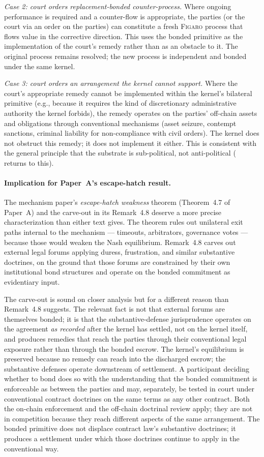 \documentclass[11pt,a4paper]{article}
\theoremstyle{remark}
\newcommand{\figaro}{\textsc{Figaro}}
\begin{document}
\emph{Case 2: court orders replacement-bonded counter-process.}
Where ongoing performance is required and a counter-flow is
appropriate, the parties (or the court via an order on the
parties) can constitute a fresh \figaro{} process that flows
value in the corrective direction. This uses the bonded
primitive as the implementation of the court's remedy rather
than as an obstacle to it. The original process remains
resolved; the new process is independent and bonded under the
same kernel.

\emph{Case 3: court orders an arrangement the kernel cannot
support.}
Where the court's appropriate remedy cannot be implemented
within the kernel's bilateral primitive (e.g., because it
requires the kind of discretionary administrative authority the
kernel forbids), the remedy operates on the parties' off-chain
assets and obligations through conventional mechanisms (asset
seizure, contempt sanctions, criminal liability for non-compliance
with civil orders). The kernel does not obstruct this remedy;
it does not implement it either. This is consistent with the
general principle that the substrate is sub-political, not
anti-political ( returns to this).

\paragraph{Implication for Paper~A's escape-hatch result.}
The mechanism paper's \emph{escape-hatch weakness} theorem
(Theorem~4.7 of Paper~A) and the carve-out in its Remark~4.8
deserve a more precise characterization than either text gives.
The theorem rules out unilateral exit paths internal to the
mechanism --- timeouts, arbitrators, governance votes ---
because those would weaken the Nash equilibrium. Remark~4.8
carves out external legal forums applying duress, frustration,
and similar substantive doctrines, on the ground that those
forums are constrained by their own institutional bond
structures and operate on the bonded commitment as evidentiary
input.

The carve-out is sound on closer analysis but for a different
reason than Remark~4.8 suggests. The relevant fact is not that
external forums are themselves bonded; it is that the
substantive-defense jurisprudence operates on the agreement
\emph{as recorded} after the kernel has settled, not on the
kernel itself, and produces remedies that reach the parties
through their conventional legal exposure rather than through
the bonded escrow. The kernel's equilibrium is preserved
because no remedy can reach into the discharged escrow; the
substantive defenses operate downstream of settlement. A
participant deciding whether to bond does so with the
understanding that the bonded commitment is enforceable as
between the parties and may, separately, be tested in court
under conventional contract doctrines on the same terms as any
other contract. Both the on-chain enforcement and the
off-chain doctrinal review apply; they are not in competition
because they reach different aspects of the same arrangement.
The bonded primitive does not displace contract law's
substantive doctrines; it produces a settlement under which
those doctrines continue to apply in the conventional way.
\end{document}
